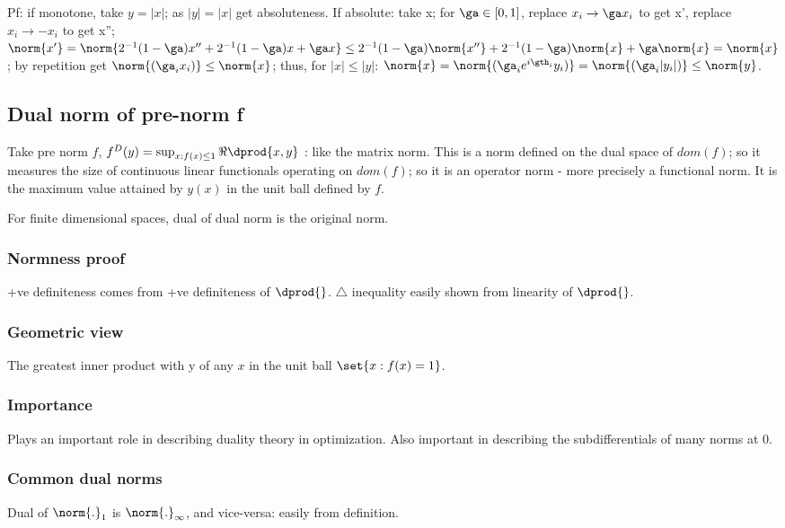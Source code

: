 \documentclass[oneside, article]{memoir}
\begin{document}
Pf: if monotone, take $y = |x|$; as $|y| = |x|$ get absoluteness. If absolute: take x; for $\ga \in [0, 1]$, replace $x_{i} \to \ga x_{i}$ to get x', replace $x_{i} \to -x_{i}$ to get x''; $\norm{x'} = \norm{2^{-1}(1-\ga)x'' + 2^{-1}(1-\ga)x + \ga x} \leq 2^{-1}(1-\ga)\norm{x''} + 2^{-1}(1-\ga)\norm{x} + \ga \norm{x} = \norm{x}$; by repetition get $\norm{(\ga_{i}x_{i})} \leq \norm{x}$; thus, for $|x| \leq |y|$: $\norm{x} = \norm{(\ga_{i}e^{i\gth_{i}}y_{i})} = \norm{(\ga_{i}|y_{i}|)} \leq \norm{y}$.

\subsection{Dual norm of pre-norm f}
Take pre norm $f$, $f^{D}(y) = \sup_{x:f(x) \leq 1} \Re \dprod{x, y}$ : like the matrix norm. This is a norm defined on the dual space of $dom(f)$; so it measures the size of continuous linear functionals operating on $dom(f)$; so it is an operator norm - more precisely a functional norm. It is the maximum value attained by $y(x)$ in the unit ball defined by $f$.

For finite dimensional spaces, dual of dual norm is the original norm. \why

\subsubsection{Normness proof}
+ve definiteness comes from +ve definiteness of $\dprod{}$. $\triangle$ inequality easily shown from linearity of $\dprod{}$.

\subsubsection{Geometric view}
The greatest inner product with y of any $x$ in the unit ball $\set{x: f(x) = 1}$.

\subsubsection{Importance}
Plays an important role in describing duality theory in optimization. Also important in describing the subdifferentials of many norms at 0.

\subsubsection{Common dual norms}
Dual of $\norm{.}_1$ is $\norm{.}_\infty$, and vice-versa: easily from definition.
\end{document}
